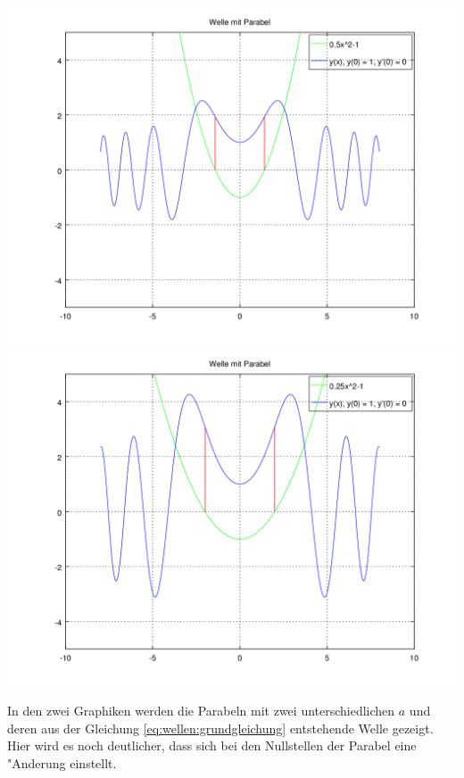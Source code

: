 \noindent
\includegraphics[scale=0.35]{./wellen/images/vara/ahalbe.png}
\includegraphics[scale=0.35]{./wellen/images/vara/aviertel.png}

In den zwei Graphiken werden die Parabeln mit zwei unterschiedlichen $a$ und 
deren aus der Gleichung \ref{eq:wellen:grundgleichung} entstehende Welle 
gezeigt. Hier wird es noch deutlicher, dass sich bei den Nullstellen der 
Parabel eine "Anderung einstellt.